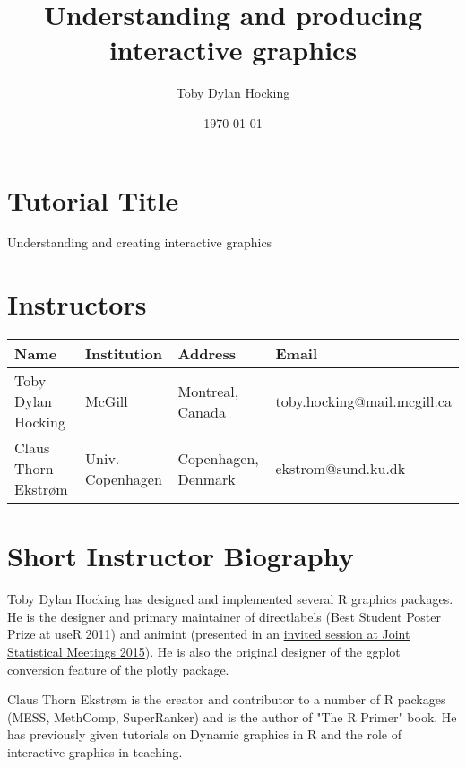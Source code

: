 \documentclass[11pt]{article}
\author{Toby Dylan Hocking}
\date{\today}
\title{Understanding and producing interactive graphics}
\begin{document}



\section{Tutorial Title}
\label{sec:orgheadline2}

Understanding and creating interactive graphics

\section{Instructors}
\label{sec:orgheadline3}

\begin{center}
\begin{tabular}{llll}
Name & Institution & Address & Email\\
\hline
Toby Dylan Hocking & McGill & Montreal, Canada & toby.hocking@mail.mcgill.ca\\
Claus Thorn Ekstrøm & Univ. Copenhagen & Copenhagen, Denmark & ekstrom@sund.ku.dk\\
\end{tabular}
\end{center}

\section{Short Instructor Biography}
\label{sec:orgheadline4}

Toby Dylan Hocking has designed and implemented several R graphics
packages. He is the designer and primary maintainer of directlabels
(Best Student Poster Prize at useR 2011) and animint (presented in an
\href{https://www.amstat.org/meetings/jsm/2015/onlineprogram/AbstractDetails.cfm?abstractid=314184\%0A}{invited
  session at Joint Statistical Meetings 2015}). He is also the
original designer of the ggplot conversion feature of the plotly
package.

Claus Thorn Ekstrøm is the creator and contributor to a number of R
packages (MESS, MethComp, SuperRanker) and is the author of "The R
Primer" book. He has previously given tutorials on Dynamic
graphics in R and the role of interactive graphics in teaching.
\end{document}
